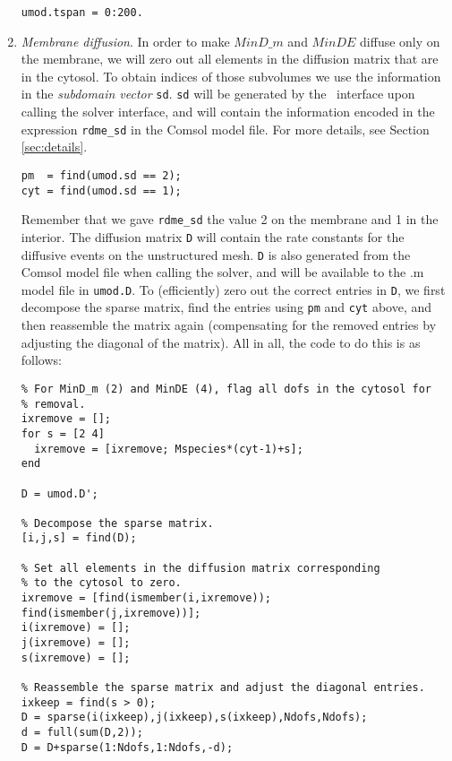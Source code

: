 \begin{enumerate}
\begin{verbatim}
umod.tspan = 0:200. 
\end{verbatim}
 
 \item \emph{Membrane diffusion}. In order to make $MinD\_m$ and
   $MinDE$ diffuse only on the membrane, we will zero out all elements
   in the diffusion matrix that are in the cytosol. To obtain indices
   of those subvolumes we use the information in the \emph{subdomain
     vector} \texttt{sd}. \texttt{sd} will be generated by the
   \varrs\ interface upon calling the solver interface, and will
   contain the information encoded in the expression \texttt{rdme\_sd}
   in the Comsol model file. For more details, see Section
   \ref{sec:details}.

\begin{verbatim}
pm  = find(umod.sd == 2);
cyt = find(umod.sd == 1);
\end{verbatim} 
 
  Remember that we gave \texttt{rdme\_sd} the value 2 on the membrane
  and 1 in the interior. The diffusion matrix \texttt{D} will contain
  the rate constants for the diffusive events on the unstructured
  mesh. \texttt{D} is also generated from the Comsol model file when
  calling the solver, and will be available to the .m model file in
  \texttt{umod.D}. To (efficiently) zero out the correct entries
  in \texttt{D}, we first decompose the sparse matrix, find the
  entries using \texttt{pm} and \texttt{cyt} above, and then
  reassemble the matrix again (compensating for the removed entries by
  adjusting the diagonal of the matrix).  All in all, the code to do
  this is as follows:

\begin{verbatim}
% For MinD_m (2) and MinDE (4), flag all dofs in the cytosol for 
% removal. 
ixremove = [];
for s = [2 4]
  ixremove = [ixremove; Mspecies*(cyt-1)+s];
end

D = umod.D';

% Decompose the sparse matrix. 
[i,j,s] = find(D);

% Set all elements in the diffusion matrix corresponding 
% to the cytosol to zero.
ixremove = [find(ismember(i,ixremove)); find(ismember(j,ixremove))];
i(ixremove) = [];
j(ixremove) = [];
s(ixremove) = [];

% Reassemble the sparse matrix and adjust the diagonal entries. 
ixkeep = find(s > 0);
D = sparse(i(ixkeep),j(ixkeep),s(ixkeep),Ndofs,Ndofs);
d = full(sum(D,2));
D = D+sparse(1:Ndofs,1:Ndofs,-d);


\end{verbatim}
\end{enumerate}
